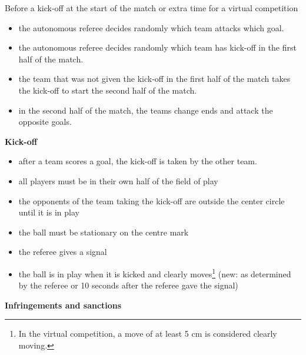 Before a kick-off at the start of the match or extra time for a virtual competition
\begin{itemize}
    \item the autonomous referee decides randomly which team attacks which goal.
    \item the autonomous referee decides randomly which team has kick-off in the first half of the match.
    \item the team that was not given the kick-off in the first half of the match takes the kick-off to start the second half of the match.
    \item in the second half of the match, the teams change ends and attack the opposite goals.
\end{itemize}


\bigskip

{\bfseries Kick-off}

\begin{itemize}
\item after a team scores a goal, the kick-off is taken by the other team. 
\item all players must be in their own half of the field of play 
\item the opponents of the team taking the kick-off are outside the center
      circle until it is in play
\item the ball must be stationary on the centre mark
\item the referee gives a signal
\item the ball is in play when it is kicked and clearly moves\footnote{In the virtual competition, a move of at least 5 cm is considered clearly moving.}
      (new: as determined by the referee or 10 seconds after the referee gave the signal)
\end{itemize}

{\bfseries Infringements and sanctions}

\headlinebox


